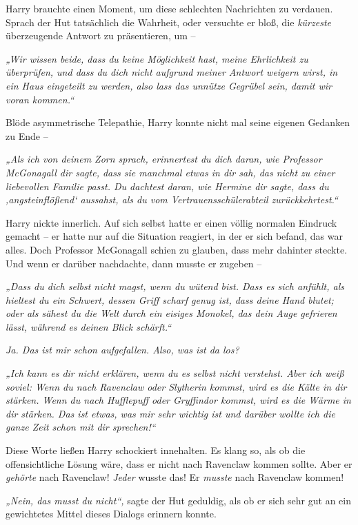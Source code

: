 Harry brauchte einen Moment, um diese schlechten Nachrichten zu verdauen. Sprach der Hut tatsächlich die Wahrheit, oder versuchte er bloß, die \emph{kürzeste} überzeugende Antwort zu präsentieren, um – 

\emph{„Wir wissen beide, dass du keine Möglichkeit hast, meine Ehrlichkeit zu überprüfen, und dass du dich nicht aufgrund meiner Antwort weigern wirst, in ein Haus eingeteilt zu werden, also lass das unnütze Gegrübel sein, damit wir voran kommen.“} 

Blöde asymmetrische Telepathie, Harry konnte nicht mal seine eigenen Gedanken zu Ende – 

\emph{„Als ich von deinem Zorn sprach, erinnertest du dich daran, wie Professor McGonagall dir sagte, dass sie manchmal etwas in dir sah, das nicht zu einer liebevollen Familie passt. Du dachtest daran, wie Hermine dir sagte, dass du ‚angsteinflößend‘ aussahst, als du vom Vertrauensschülerabteil zurückkehrtest.“} 

Harry nickte innerlich. Auf sich selbst hatte er einen völlig normalen Eindruck gemacht – er hatte nur auf die Situation reagiert, in der er sich befand, das war alles. Doch Professor McGonagall schien zu glauben, dass mehr dahinter steckte. Und wenn er darüber nachdachte, dann musste er zugeben – 

\emph{„Dass du dich selbst nicht magst, wenn du wütend bist. Dass es sich anfühlt, als hieltest du ein Schwert, dessen Griff scharf genug ist, dass deine Hand blutet; oder als sähest du die Welt durch ein eisiges Monokel, das dein Auge gefrieren lässt, während es deinen Blick schärft.“ }

\emph{Ja. Das ist mir schon aufgefallen. Also, was ist da los? }

\emph{„Ich kann es dir nicht erklären, wenn du es selbst nicht verstehst. Aber ich weiß soviel: Wenn du nach Ravenclaw oder Slytherin kommst, wird es die Kälte in dir stärken. Wenn du nach Hufflepuff oder Gryffindor kommst, wird es die Wärme in dir stärken. Das ist etwas, was mir sehr wichtig ist und darüber wollte ich die ganze Zeit schon mit dir sprechen!“} 

Diese Worte ließen Harry schockiert innehalten. Es klang so, als ob die offensichtliche Lösung wäre, dass er nicht nach Ravenclaw kommen sollte. Aber er \emph{gehörte} nach Ravenclaw! \emph{Jeder} wusste das! Er \emph{musste} nach Ravenclaw kommen! 

\emph{„Nein, das musst du nicht“,} sagte der Hut geduldig, als ob er sich sehr gut an ein gewichtetes Mittel dieses Dialogs erinnern konnte. 

